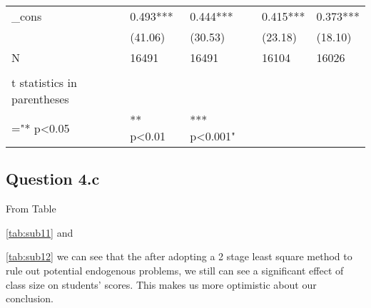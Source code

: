 \documentclass{article}
\begin{document}
{{{{{{{{{{{{{{{{\begin{table}[htbp]
\begin{tabular}{lllrr}
    \_cons & 0.493*** & 0.444*** & \multicolumn{1}{l}{0.415***} & \multicolumn{1}{l}{0.373***} \\
          & (41.06) & (30.53) & \multicolumn{1}{l}{(23.18)} & \multicolumn{1}{l}{(18.10)} \\
    N     & 16491 & 16491 & \multicolumn{1}{l}{16104} & \multicolumn{1}{l}{16026} \\
    \midrule
          &       &       &       &  \\
    t statistics in parentheses &       &       &       &  \\
    ="* p<0.05 &  ** p<0.01 &  *** p<0.001" &       &  \\
    \bottomrule
    \bottomrule
    \end{tabular}%
  \label{tab:addlabel}%
\end{table}%



\subsection*{Question 4.c}

From Table {\ref{tab:sub11}  and {\ref{tab:sub12} we can see that the after adopting a 2 stage least square method to rule out potential endogenous problems, we still can see a significant effect of class size on students' scores. This makes us more optimistic about our conclusion.

}}}}}}}}}}}}}}}}}}
\end{document}
